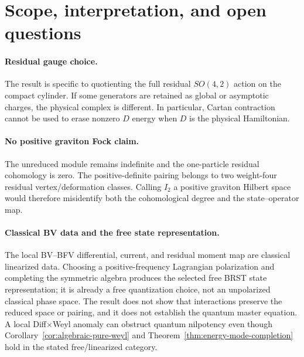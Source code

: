 \documentclass[11pt]{article}
\theoremstyle{definition}
\theoremstyle{remark}
\begin{document}
\section{Scope, interpretation, and open questions}\label{sec:scope}

\paragraph{Residual gauge choice.}
The result is specific to quotienting the full residual $SO(4,2)$ action on
the compact cylinder.  If some generators are retained as global or
asymptotic charges, the physical complex is different.  In particular,
Cartan contraction cannot be used to erase nonzero $D$ energy when $D$ is
the physical Hamiltonian.

\paragraph{No positive graviton Fock claim.}
The unreduced module remains indefinite and the one-particle residual
cohomology is zero.  The positive-definite pairing belongs to two
weight-four residual vertex/deformation classes.
Calling $I_2$ a positive graviton Hilbert space would therefore misidentify
both the cohomological degree and the state--operator map.

\paragraph{Classical BV data and the free state representation.}
The local BV--BFV differential, current, and residual moment map are
classical linearized data.  Choosing a positive-frequency Lagrangian
polarization and completing the symmetric algebra produces the selected free
BRST state representation; it is already a free quantization choice, not an
unpolarized classical phase space.  The result does not show that interactions
preserve the reduced space or pairing, and it does not establish the quantum
master equation.  A local Diff$\times$Weyl anomaly can obstruct quantum
nilpotency even though Corollary~\ref{cor:algebraic-pure-weyl} and
Theorem~\ref{thm:energy-mode-completion} hold in the stated free/linearized
category.
\end{document}
